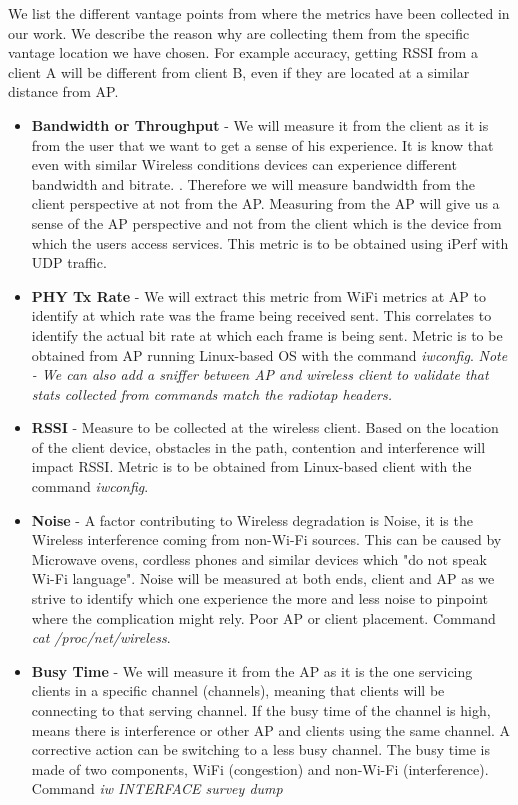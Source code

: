 We list the different vantage points from where the metrics have been collected in our work. We describe the reason why are collecting them from the specific vantage location we have chosen. For example accuracy, getting RSSI from a client A will be different from client B, even if they are located at a similar distance from AP.

\begin{itemize}
	\item \textbf{Bandwidth or Throughput} - We will measure it from the client as it is from the user that we want to get a sense of his experience. It is know that even with similar Wireless conditions devices can experience different bandwidth and bitrate. \cite{measuring_user_traffic}. Therefore we will measure bandwidth from the client perspective at not from the AP. Measuring from the AP will give us a sense of the AP perspective and not from the client which is the device from which the users access services. This metric is to be obtained using iPerf with UDP traffic.
	\item \textbf{PHY Tx Rate} - We will extract this metric from WiFi metrics at AP to identify at which rate was the frame being received sent. This correlates to identify the actual bit rate at which each frame is being sent. Metric is to be obtained from AP running Linux-based OS with the command \emph{iwconfig}.
	\emph{Note - We can also add a sniffer between AP and wireless client to validate that stats collected from commands match the radiotap headers.}
	\item \textbf{RSSI} - Measure to be collected at the wireless client. Based on the location of the client device, obstacles in the path, contention and interference will impact RSSI. Metric is to be obtained from Linux-based client with the command \emph{iwconfig}.
	\item \textbf{Noise} - A factor contributing to Wireless degradation is Noise, it is the Wireless interference coming from non-Wi-Fi sources. This can be caused by Microwave ovens, cordless phones and similar devices which "do not speak Wi-Fi language". Noise will be measured at both ends, client and AP as we strive to identify which one experience the more and less noise to pinpoint where the complication might rely. Poor AP or client placement. Command \emph{cat /proc/net/wireless}.
	\item \textbf{Busy Time} - We will measure it from the AP as it is the one servicing clients in a specific channel (channels), meaning that clients will be connecting to that serving channel. If the busy time of the channel is high, means there is interference or other AP and clients using the same channel. A corrective action can be switching to a less busy channel. The busy time is made of two components, WiFi (congestion) and non-Wi-Fi (interference). Command \emph{iw INTERFACE survey dump}	
		
\end{itemize}
